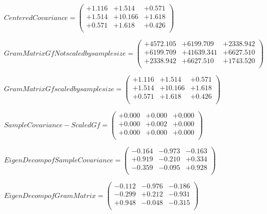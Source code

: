 \documentclass[9pt]{article}
\theoremstyle{plain}
\theoremstyle{definition}
\theoremstyle{remark}
\numberwithin{equation}{section}
\begin{document}
$Centered Covariance = \left(
\begin{array}{
ccc}
+1.116 & +1.514 & +0.571 \\
+1.514 & +10.166 & +1.618 \\
+0.571 & +1.618 & +0.426 \\
\end{array}
\right)$ \newline 

$Gram Matrix Gf Not scaled by sample size = \left(
\begin{array}{
ccc}
+4572.105 & +6199.709 & +2338.942 \\
+6199.709 & +41639.341 & +6627.510 \\
+2338.942 & +6627.510 & +1743.520 \\
\end{array}
\right)$ \newline 

$Gram Matrix Gf  scaled by sample size = \left(
\begin{array}{
ccc}
+1.116 & +1.514 & +0.571 \\
+1.514 & +10.166 & +1.618 \\
+0.571 & +1.618 & +0.426 \\
\end{array}
\right)$ \newline 

$SampleCovariance - Scaled Gf = \left(
\begin{array}{
ccc}
+0.000 & +0.000 & +0.000 \\
+0.000 & +0.002 & +0.000 \\
+0.000 & +0.000 & +0.000 \\
\end{array}
\right)$ \newline 

$EigenDecomp of SampleCovariance = \left(
\begin{array}{
ccc}
-0.164 & -0.973 & -0.163 \\
+0.919 & -0.210 & +0.334 \\
-0.359 & -0.095 & +0.928 \\
\end{array}
\right)$ \newline 

$EigenDecomp of Gram Matrix = \left(
\begin{array}{
ccc}
-0.112 & -0.976 & -0.186 \\
-0.299 & +0.212 & -0.931 \\
+0.948 & -0.048 & -0.315 \\
\end{array}
\right)$ \newline 
\end{document}
